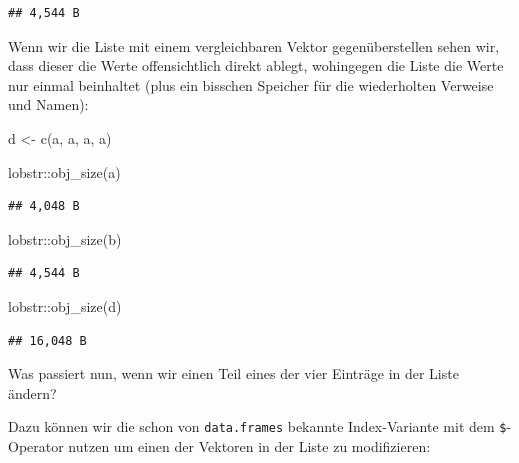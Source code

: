 \documentclass[
]{book}
\newenvironment{Shaded}{\begin{snugshade}}{\end{snugshade}}
\newcommand{\DecValTok}[1]{\textcolor[rgb]{0.00,0.00,0.81}{#1}}
\newcommand{\FunctionTok}[1]{\textcolor[rgb]{0.00,0.00,0.00}{#1}}
\newcommand{\NormalTok}[1]{#1}
\newcommand{\OtherTok}[1]{\textcolor[rgb]{0.56,0.35,0.01}{#1}}
\newcommand{\SpecialCharTok}[1]{\textcolor[rgb]{0.00,0.00,0.00}{#1}}
\begin{document}
\begin{verbatim}
## 4,544 B
\end{verbatim}

Wenn wir die Liste mit einem vergleichbaren Vektor gegenüberstellen sehen wir, dass dieser die Werte offensichtlich direkt ablegt, wohingegen die Liste die Werte nur einmal beinhaltet (plus ein bisschen Speicher für die wiederholten Verweise und Namen):

\begin{Shaded}
\begin{Highlighting}[]
\NormalTok{d }\OtherTok{\textless{}{-}} \FunctionTok{c}\NormalTok{(a, a, a, a)}

\NormalTok{lobstr}\SpecialCharTok{::}\FunctionTok{obj\_size}\NormalTok{(a)}
\end{Highlighting}
\end{Shaded}

\begin{verbatim}
## 4,048 B
\end{verbatim}

\begin{Shaded}
\begin{Highlighting}[]
\NormalTok{lobstr}\SpecialCharTok{::}\FunctionTok{obj\_size}\NormalTok{(b)}
\end{Highlighting}
\end{Shaded}

\begin{verbatim}
## 4,544 B
\end{verbatim}

\begin{Shaded}
\begin{Highlighting}[]
\NormalTok{lobstr}\SpecialCharTok{::}\FunctionTok{obj\_size}\NormalTok{(d)}
\end{Highlighting}
\end{Shaded}

\begin{verbatim}
## 16,048 B
\end{verbatim}

Was passiert nun, wenn wir einen Teil eines der vier Einträge in der Liste ändern?

Dazu können wir die schon von \texttt{data.frames} bekannte Index-Variante mit dem \texttt{\$}-Operator nutzen um einen der Vektoren in der Liste zu modifizieren:

\begin{Shaded}
\end{Shaded}
\end{document}
